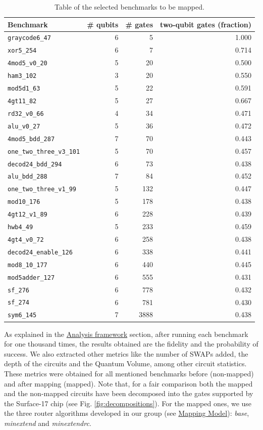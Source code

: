 \begin{table}[htbp]
\caption{\label{tab:map_selected_benchs}
Table of the selected benchmarks to be mapped.}
\centering
\small
\begin{tabular}{lrrr}
\hline
Benchmark & \# qubits & \# gates & two-qubit gates (fraction)\\
\hline
\texttt{graycode6\_47} & 6 & 5 & 1.000\\
\texttt{xor5\_254} & 6 & 7 & 0.714\\
\texttt{4mod5\_v0\_20} & 5 & 20 & 0.500\\
\texttt{ham3\_102} & 3 & 20 & 0.550\\
\texttt{mod5d1\_63} & 5 & 22 & 0.591\\
\texttt{4gt11\_82} & 5 & 27 & 0.667\\
\texttt{rd32\_v0\_66} & 4 & 34 & 0.471\\
\texttt{alu\_v0\_27} & 5 & 36 & 0.472\\
\texttt{4mod5\_bdd\_287} & 7 & 70 & 0.443\\
\texttt{one\_two\_three\_v3\_101} & 5 & 70 & 0.457\\
\texttt{decod24\_bdd\_294} & 6 & 73 & 0.438\\
\texttt{alu\_bdd\_288} & 7 & 84 & 0.452\\
\texttt{one\_two\_three\_v1\_99} & 5 & 132 & 0.447\\
\texttt{mod10\_176} & 5 & 178 & 0.438\\
\texttt{4gt12\_v1\_89} & 6 & 228 & 0.439\\
\texttt{hwb4\_49} & 5 & 233 & 0.459\\
\texttt{4gt4\_v0\_72} & 6 & 258 & 0.438\\
\texttt{decod24\_enable\_126} & 6 & 338 & 0.441\\
\texttt{mod8\_10\_177} & 6 & 440 & 0.445\\
\texttt{mod5adder\_127} & 6 & 555 & 0.431\\
\texttt{sf\_276} & 6 & 778 & 0.432\\
\texttt{sf\_274} & 6 & 781 & 0.430\\
\texttt{sym6\_145} & 7 & 3888 & 0.438\\
\hline
\end{tabular}
\end{table}


As explained in the \href{chapter-4_old.org}{Analysis framework} section, after running each benchmark for one thousand times, the results obtained are the fidelity and the probability of success.
We also extracted other metrics like the number of SWAPs added, the depth of the circuits and the Quantum Volume, among other circuit statistics.
These metrics were obtained for all mentioned benchmarks before (non-mapped) and after mapping (mapped). 
Note that, for a fair comparison both the mapped and the non-mapped circuits have been decomposed into the gates supported by  the Surface-17 chip (see Fig. \ref{fig:decompositions}). 
For the mapped ones, we use the three router algorithms developed in our group (see \hyperref[sec:org19dc500]{Mapping Model}): \textit{base}, \textit{minextend} and \textit{minextendrc}.

